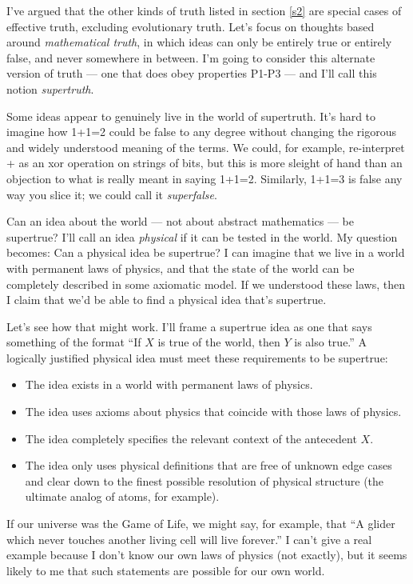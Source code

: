 \documentclass[11pt, oneside]{article}   	%
\begin{document}
I've argued that the other kinds of truth listed in section \ref{s2}
are special cases of effective truth, excluding evolutionary truth.
Let's focus on thoughts based around {\em mathematical truth}, in which ideas
can only be
entirely true or entirely false, and never somewhere in between.
I'm going to consider this alternate version
of truth --- one that does obey properties P1-P3 --- and I'll call this notion
{\em supertruth}.

Some ideas appear to genuinely live in the world of supertruth. It's hard to
imagine how 1+1=2 could be false to any degree without changing the rigorous and
widely understood meaning of the terms. We could, for example,
re-interpret + as an xor operation on strings of
bits, but this is more sleight of hand than an objection to what is
really meant in saying 1+1=2. Similarly, 1+1=3 is false any way you slice it; we
could call it {\em superfalse}.

Can an idea about the world --- not about abstract mathematics ---
be supertrue?
I'll call an idea {\em physical} if it can be tested in the world.
My question becomes: Can a physical idea be supertrue?
I can imagine that we live in a world with permanent laws of physics, and that
the
state of the world can be completely described in some axiomatic
model.
If we understood these laws, then I claim that we'd be able to find
a physical idea that's supertrue.

Let's see how that might work.
I'll frame a supertrue idea as one that says something of the format ``If $X$ is
true of the world, then $Y$ is also true.''
A logically justified physical idea must meet these
requirements to be supertrue:
\begin{itemize}
    \item The idea exists in a world with permanent laws of physics.
    \item The idea uses axioms about physics that coincide with those laws of
        physics.
    \item The idea completely specifies the relevant context of the antecedent
        $X$.
    \item The idea only uses physical definitions that are free of unknown edge
        cases and clear down to
        the finest possible resolution of physical structure (the
        ultimate analog of atoms, for example).
\end{itemize}
If our universe was the Game of Life, we might say, for example, that
``A glider which never touches another living cell will live forever.''
I can't give a real example because I don't know our own laws of physics (not
exactly), but it
seems likely to me that such statements are possible for our own world.
\end{document}

